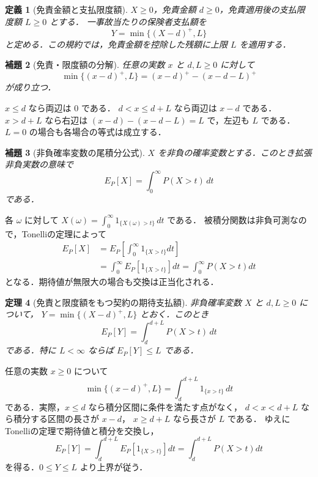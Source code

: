 \documentclass[a5paper,10pt,onecolumn]{jsarticle}
\makeatletter
\theoremstyle{mathnotetheorem}
\newtheorem{theorem}{定理}[section]
\newtheorem{definition}[theorem]{定義}
\newtheorem{lemma}[theorem]{補題}
\renewcommand{\proofname}{証明}
\renewenvironment{proof}[1][\proofname]{%
  \par\pushQED{\qed}\normalfont\topsep4\p@\@plus2\p@\relax
  \trivlist\item[\hskip\labelsep\bfseries #1]\ignorespaces
}{\popQED\endtrivlist\@endpefalse}
\makeatother
\begin{document}
\begin{definition}[免責金額と支払限度額]
$X\ge0$，免責金額 $d\ge0$，免責適用後の支払限度額 $L\ge0$ とする．
一事故当たりの保険者支払額を
\[
 Y=\min\{(X-d)^+,L\}
\]
と定める．この規約では，免責金額を控除した残額に上限 $L$ を適用する．
\end{definition}

\begin{lemma}[免責・限度額の分解]\label{lem:deduct}
任意の実数 $x$ と $d,L\ge0$ に対して
\[
 \min\{(x-d)^+,L\}=(x-d)^+-(x-d-L)^+
\]
が成り立つ．
\end{lemma}
\begin{proof}
$x\le d$ なら両辺は $0$ である．
$d<x\le d+L$ なら両辺は $x-d$ である．
$x>d+L$ なら右辺は $(x-d)-(x-d-L)=L$ で，左辺も $L$ である．
$L=0$ の場合も各場合の等式は成立する．\end{proof}

\begin{lemma}[非負確率変数の尾積分公式]\label{lem:tail}
$X$ を非負の確率変数とする．このとき拡張非負実数の意味で
\[
 E_P[X]=\int_0^\infty P(X>t)\,dt
\]
である．
\end{lemma}
\begin{proof}
各 $\omega$ に対して
$X(\omega)=\int_0^\infty 1_{\{X(\omega)>t\}}\,dt$ である．
被積分関数は非負可測なので，Tonelliの定理によって
\begin{align*}
 E_P[X]
 &=E_P\left[\int_0^\infty1_{\{X>t\}}dt\right]\\
 &=\int_0^\infty E_P[1_{\{X>t\}}]dt
 =\int_0^\infty P(X>t)dt
\end{align*}
となる．期待値が無限大の場合も交換は正当化される．\end{proof}

\begin{theorem}[免責と限度額をもつ契約の期待支払額]\label{thm:deductpv}
非負確率変数 $X$ と $d,L\ge0$ について，
$Y=\min\{(X-d)^+,L\}$ とおく．このとき
\[
 E_P[Y]=\int_d^{d+L}P(X>t)\,dt
\]
である．特に $L<\infty$ ならば $E_P[Y]\le L$ である．
\end{theorem}
\begin{proof}
任意の実数 $x\ge0$ について
\[
 \min\{(x-d)^+,L\}=\int_d^{d+L}1_{\{x>t\}}\,dt
\]
である．実際，$x\le d$ なら積分区間に条件を満たす点がなく，
$d<x<d+L$ なら積分する区間の長さが $x-d$，
$x\ge d+L$ なら長さが $L$ である．
ゆえにTonelliの定理で期待値と積分を交換し，
\[
 E_P[Y]=\int_d^{d+L}E_P[1_{\{X>t\}}]dt
 =\int_d^{d+L}P(X>t)dt
\]
を得る．$0\le Y\le L$ より上界が従う．\end{proof}
\end{document}
